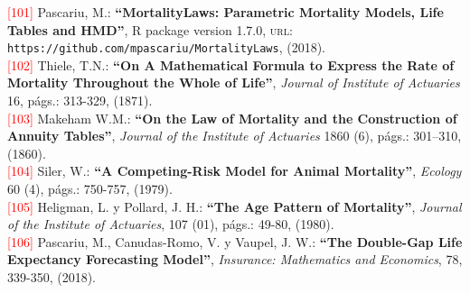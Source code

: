 \noindent \textcolor{red}{[101]} Pascariu, M.: \textbf{``MortalityLaws: Parametric Mortality Models, Life Tables and HMD''}, R package version 1.7.0, \textsc{url:}  {\small{\texttt{https://github.com/mpascariu/MortalityLaws}}}, (2018).\\

\noindent \textcolor{red}{[102]} Thiele, T.N.: \textbf{``On A Mathematical Formula to Express the Rate of Mortality Throughout the Whole of Life''}, \textit{Journal of Institute of Actuaries} 16,  págs.: 313-329, (1871).\\

\noindent \textcolor{red}{[103]} Makeham W.M.: \textbf{``On the Law of Mortality and the Construction of Annuity Tables''}, \textit{Journal of the Institute of Actuaries} 1860 (6), págs.: 301–310, (1860).\\

\noindent \textcolor{red}{[104]} Siler, W.: \textbf{``A Competing-Risk Model for Animal Mortality''}, \textit{Ecology} 60 (4),  págs.: 750-757, (1979).\\

\noindent \textcolor{red}{[105]} Heligman, L. y Pollard, J. H.: \textbf{``The Age Pattern of Mortality''}, \textit{Journal of the Institute of
Actuaries}, 107 (01),  págs.: 49-80, (1980).\\

\noindent \textcolor{red}{[106]} Pascariu, M., Canudas-Romo, V. y Vaupel, J. W.: \textbf{``The Double-Gap Life Expectancy Forecasting Model''}, \textit{Insurance: Mathematics and Economics}, 78, 339-350, (2018).\\


